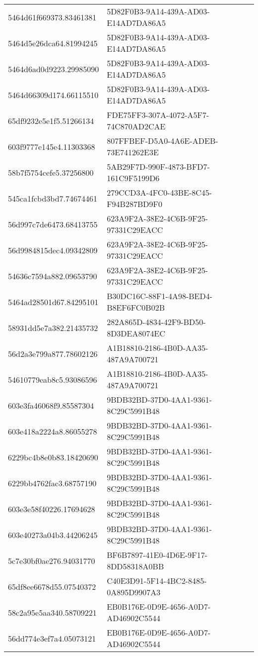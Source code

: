 \begin{tabular}{ll}
5464d61f669373.83461381 & 5D82F0B3-9A14-439A-AD03-E14AD7DA86A5 \\
5464d5e26dca64.81994245 & 5D82F0B3-9A14-439A-AD03-E14AD7DA86A5 \\
5464d6ad0d9223.29985090 & 5D82F0B3-9A14-439A-AD03-E14AD7DA86A5 \\
5464d66309d174.66115510 & 5D82F0B3-9A14-439A-AD03-E14AD7DA86A5 \\
65df9232e5e1f5.51266134 & FDE75FF3-307A-4072-A5F7-74C870AD2CAE \\
603f9777e145e4.11303368 & 807FFBEF-D5A0-4A6E-ADEB-73E741262E3E \\
58b7f5754cefe5.37256800 & 5AB29F7D-990F-4873-BFD7-161C9F5199D6 \\
545ca1fcbd3bd7.74674461 & 279CCD3A-4FC0-43BE-8C45-F94B287BD9F0 \\
56d997c7de6473.68413755 & 623A9F2A-38E2-4C6B-9F25-97331C29EACC \\
56d9984815dec4.09342809 & 623A9F2A-38E2-4C6B-9F25-97331C29EACC \\
54636c7594a882.09653790 & 623A9F2A-38E2-4C6B-9F25-97331C29EACC \\
5464ad28501d67.84295101 & B30DC16C-88F1-4A98-BED4-B8EF6FC0B02B \\
58931dd5e7a382.21435732 & 282A865D-4834-42F9-BD50-8D3DEA8074EC \\
56d2a3e799a877.78602126 & A1B18810-2186-4B0D-AA35-487A9A700721 \\
54610779eab8c5.93086596 & A1B18810-2186-4B0D-AA35-487A9A700721 \\
603e3fa46068f9.85587304 & 9BDB32BD-37D0-4AA1-9361-8C29C5991B48 \\
603e418a2224a8.86055278 & 9BDB32BD-37D0-4AA1-9361-8C29C5991B48 \\
6229bc4b8e0b83.18420690 & 9BDB32BD-37D0-4AA1-9361-8C29C5991B48 \\
6229bb4762fac3.68757190 & 9BDB32BD-37D0-4AA1-9361-8C29C5991B48 \\
603e3e58f40226.17694628 & 9BDB32BD-37D0-4AA1-9361-8C29C5991B48 \\
603e40273a04b3.44206245 & 9BDB32BD-37D0-4AA1-9361-8C29C5991B48 \\
5c7e30bf0ae276.94031770 & BF6B7897-41E0-4D6E-9F17-8DD58318A0BB \\
65df8ee6678d55.07540372 & C40E3D91-5F14-4BC2-8485-0A895D9907A3 \\
58c2a95e5aa340.58709221 & EB0B176E-0D9E-4656-A0D7-AD46902C5544 \\
56dd774e3ef7a4.05073121 & EB0B176E-0D9E-4656-A0D7-AD46902C5544 \\

\end{tabular}
